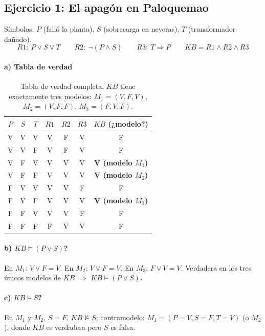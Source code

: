 \subsection{Ejercicio 1: El apagón en Paloquemao}

Símbolos: $P$ (falló la planta), $S$ (sobrecarga en neveras), $T$ (transformador dañado).
\[
    R1:\ P\lor S\lor T \qquad R2:\ \neg(P\land S) \qquad R3:\ T\Rightarrow P \qquad
    KB = R1\land R2\land R3
\]

\paragraph{a) Tabla de verdad}

\begin{table}[H]
\centering
\begin{tabular}{ccc|ccc|c}
\toprule
$P$ & $S$ & $T$ & $R1$ & $R2$ & $R3$ & $KB$ (¿modelo?) \\
\midrule
V & V & V & V & F & V & F \\
V & V & F & V & F & V & F \\
V & F & V & V & V & V & \textbf{V (modelo $M_1$)} \\
V & F & F & V & V & V & \textbf{V (modelo $M_2$)} \\
F & V & V & V & V & F & F \\
F & V & F & V & V & V & \textbf{V (modelo $M_3$)} \\
F & F & V & V & V & F & F \\
F & F & F & F & V & V & F \\
\bottomrule
\end{tabular}
\caption{Tabla de verdad completa. $KB$ tiene exactamente tres modelos: $M_1=(V,F,V)$,
$M_2=(V,F,F)$, $M_3=(F,V,F)$.}
\end{table}

\paragraph{b) $KB \models (P\lor S)$?}
En $M_1$: $V\lor F = V$. En $M_2$: $V\lor F=V$. En $M_3$: $F\lor V=V$. Verdadera en los tres únicos
modelos de $KB$ $\Rightarrow$ \textbf{$KB \models (P\lor S)$.}

\paragraph{c) $KB \models S$?}
En $M_1$ y $M_2$, $S=F$. \textbf{$KB \not\models S$}; contramodelo: $M_1=(P{=}V,S{=}F,T{=}V)$ (o
$M_2$), donde $KB$ es verdadera pero $S$ es falsa.

